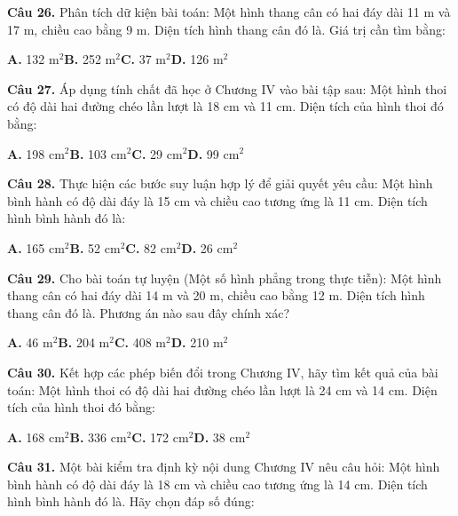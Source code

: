 \documentclass[11pt,a4paper]{article}
\begin{document}
\textbf{\color{primary} Câu 26.} Phân tích dữ kiện bài toán: Một hình thang cân có hai đáy dài 11 m và 17 m, chiều cao bằng 9 m. Diện tích hình thang cân đó là. Giá trị cần tìm bằng:\par
\hspace*{1.5em}\textbf{A.} 132 m$^2$\quad\quad \textbf{B.} 252 m$^2$\quad\quad \textbf{C.} 37 m$^2$\quad\quad \textbf{D.} 126 m$^2$\par\vspace{2pt}
\textbf{\color{primary} Câu 27.} Áp dụng tính chất đã học ở Chương IV vào bài tập sau: Một hình thoi có độ dài hai đường chéo lần lượt là 18 cm và 11 cm. Diện tích của hình thoi đó bằng:\par
\hspace*{1.5em}\textbf{A.} 198 cm$^2$\quad\quad \textbf{B.} 103 cm$^2$\quad\quad \textbf{C.} 29 cm$^2$\quad\quad \textbf{D.} 99 cm$^2$\par\vspace{2pt}
\textbf{\color{primary} Câu 28.} Thực hiện các bước suy luận hợp lý để giải quyết yêu cầu: Một hình bình hành có độ dài đáy là 15 cm và chiều cao tương ứng là 11 cm. Diện tích hình bình hành đó là:\par
\hspace*{1.5em}\textbf{A.} 165 cm$^2$\quad\quad \textbf{B.} 52 cm$^2$\quad\quad \textbf{C.} 82 cm$^2$\quad\quad \textbf{D.} 26 cm$^2$\par\vspace{2pt}
\textbf{\color{primary} Câu 29.} Cho bài toán tự luyện (Một số hình phẳng trong thực tiễn): Một hình thang cân có hai đáy dài 14 m và 20 m, chiều cao bằng 12 m. Diện tích hình thang cân đó là. Phương án nào sau đây chính xác?\par
\hspace*{1.5em}\textbf{A.} 46 m$^2$\quad\quad \textbf{B.} 204 m$^2$\quad\quad \textbf{C.} 408 m$^2$\quad\quad \textbf{D.} 210 m$^2$\par\vspace{2pt}
\textbf{\color{primary} Câu 30.} Kết hợp các phép biến đổi trong Chương IV, hãy tìm kết quả của bài toán: Một hình thoi có độ dài hai đường chéo lần lượt là 24 cm và 14 cm. Diện tích của hình thoi đó bằng:\par
\hspace*{1.5em}\textbf{A.} 168 cm$^2$\quad\quad \textbf{B.} 336 cm$^2$\quad\quad \textbf{C.} 172 cm$^2$\quad\quad \textbf{D.} 38 cm$^2$\par\vspace{2pt}
\textbf{\color{primary} Câu 31.} Một bài kiểm tra định kỳ nội dung Chương IV nêu câu hỏi: Một hình bình hành có độ dài đáy là 18 cm và chiều cao tương ứng là 14 cm. Diện tích hình bình hành đó là. Hãy chọn đáp số đúng:\par
\end{document}
